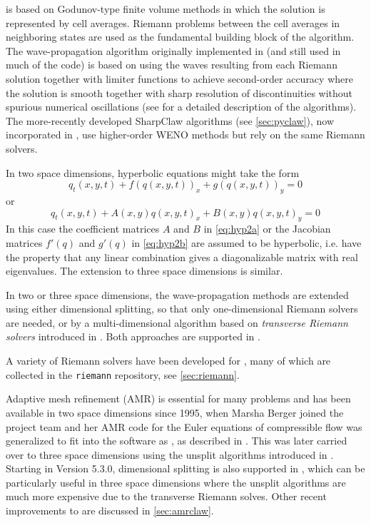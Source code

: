 \clawpack is based on Godunov-type finite volume methods in which
the solution is represented by cell averages.  Riemann problems
between the cell averages in neighboring states are used as the
fundamental building block of the algorithm.
The wave-propagation algorithm originally
implemented in \clawpack (and still used in much of the code) is based on
using the waves resulting from each Riemann solution together with limiter
functions to achieve second-order accuracy where the solution is smooth
together with sharp resolution of discontinuities without spurious numerical
oscillations (see \cite{rjl:fvmhp} for a detailed description of the
algorithms).   The more-recently developed SharpClaw algorithms (see
\cref{sec:pyclaw}), now incorporated in \pyclaw, use higher-order WENO methods
but rely on the same Riemann solvers.

In two space dimensions, hyperbolic equations might take the form
\begin{equation}\label{eq:hyp2a}
q_t(x,y,t) + f(q(x,y,t))_x + g(q(x,y,t))_y = 0
\end{equation}
or
\begin{equation}\label{eq:hyp2b}
q_t(x,y,t) + A(x,y)q(x,y,t)_x + B(x,y)q(x,y,t)_y = 0
\end{equation} 
In this case the
coefficient matrices $A$ and $B$ in \cref{eq:hyp2a} or the Jacobian matrices
$f'(q)$ and $g'(q)$ in \cref{eq:hyp2b} are assumed to be hyperbolic, i.e. have
the property that any
linear combination gives a diagonalizable matrix with real eigenvalues.
The extension to three space dimensions is similar.

In two or three space dimensions, the wave-propagation methods
are extended using either dimensional splitting, so that only
one-dimensional Riemann solvers are needed, or by a multi-dimensional
algorithm based on {\em transverse Riemann solvers} introduced in 
\cite{rjl:wpalg}.  Both approaches are supported in \clawpack.

A variety of Riemann solvers have been developed for \clawpack, many of which
are collected in the \texttt{riemann} repository, see \cref{sec:riemann}.

Adaptive mesh refinement (AMR) is essential for many problems and 
has been available in two space dimensions
since 1995, when Marsha Berger joined the project team and her AMR
code for the Euler equations of compressible flow was generalized to fit into
the software as \amrclaw, as described in \cite{Berger:1998ia}.  This was
later carried over to three space dimensions using the unsplit algorithms
introduced in \cite{jol-rjl:3d}.  Starting in Version 5.3.0, dimensional
splitting is also supported in \amrclaw, which can be particularly useful in
three space dimensions where the unsplit algorithms are much more expensive
due to the transverse Riemann solves.  Other recent improvements to \amrclaw
are discussed in \cref{sec:amrclaw}.

